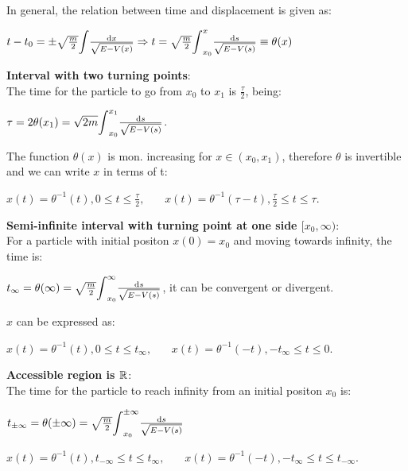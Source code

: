 In general, the relation between time and displacement is given as: \\
\centerline{$t-t_{0}=\pm\sqrt{\frac{m}{2}}\scaleint{5ex}\frac{\dd{x}}{\sqrt{E-V(x)}}\then t=\sqrt{\frac{m}{2}}\scaleint{5ex}
_{x_{0}}^{x}\frac{\dd{s}}{\sqrt{E-V(s)}}\equiv \theta(x)$}

\textbf{Interval with two turning points}:\\
The time for the particle to go from $x_{0}$ to $x_{1}$ is $\frac{\tau}{2}$, being:\\
\centerline{$\tau=2\theta(x_{1})=\sqrt{2m}\scaleint{5ex}_{x_{0}}^{x_{1}}\frac{\dd{s}}{\sqrt{E-V(s)}}$.}

The function $\theta(x)$ is mon. increasing for $x\in(x_{0},x_{1})$, therefore $\theta$ is invertible and we can write $x$ in terms of t:
\\[2pt]
\centerline{$x(t)=\theta^{-1}(t), 0\leq t\leq \frac{\tau}{2},\ \ \ \ \ \ \ \ 
x(t)=\theta^{-1}(\tau-t), \frac{\tau}{2}\leq t\leq \tau$.}
\smallskip

\textbf{Semi-infinite interval with turning point at one side $[x_{0},\infty)$}:\\
For a particle with initial positon $x(0)=x_{0}$ and moving towards infinity, the time is:\\
\centerline{$t_{\infty}=\theta(\infty)=\sqrt{\frac{m}{2}}\scaleint{5ex}_{x_{0}}^{\infty}\frac{\dd{s}}{\sqrt{E-V(s)}}$, it can be convergent or divergent.}
$x$ can be expressed as:\\
\centerline{$x(t)=\theta^{-1}(t), 0\leq t\leq t_{\infty},\ \ \ \ \ \ \ \ 
x(t)=\theta^{-1}(-t), -t_{\infty}\leq t\leq 0$.}
\smallskip


\textbf{Accessible region is $\mathbb{R}$}:\\
The time for the particle to reach infinity from an initial positon $x_{0}$ is:\\
\centerline{$t_{\pm \infty}=\theta(\pm\infty)=\sqrt{\frac{m}{2}}\scaleint{5ex}_{x_{0}}^{\pm\infty}\frac{\dd{s}}{\sqrt{E-V(s)}}$}
\centerline{$x(t)=\theta^{-1}(t), t_{-\infty}\leq t\leq t_{\infty},\ \ \ \ \ \ \ \ 
x(t)=\theta^{-1}(-t), -t_{\infty}\leq t\leq t_{-\infty}$.}

\smallskip

